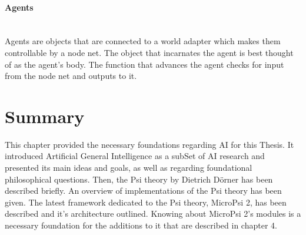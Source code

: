             \paragraph{Agents}$\;$ \\
Agents are objects that are connected to a world adapter which makes them controllable by a node net. The object that incarnates the agent is best thought of as the agent's body. The function that advances the agent checks for input from the node net and outputs to it.
        
    \section{Summary}
This chapter provided the necessary foundations regarding AI for this Thesis. It introduced Artificial General Intelligence as a subSet of AI research and presented its main ideas and goals, as well as regarding foundational philosophical questions.
Then, the Psi theory by Dietrich Dörner has been described briefly. An overview of implementations of the Psi theory has been given. The latest framework dedicated to the Psi theory, MicroPsi 2, has been described and it's architecture outlined. Knowing about MicroPsi 2's modules is a necessary foundation for the additions to it that are described in chapter 4.

